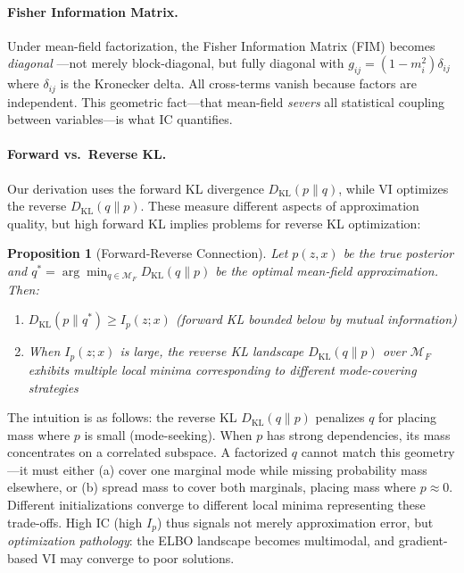 \documentclass[10pt]{article} %
\theoremstyle{plain}
\newtheorem{proposition}[theorem]{Proposition}
\theoremstyle{definition}
\newcommand{\MI}{I}
\newcommand{\KL}{D_{\mathrm{KL}}}
\begin{document}
\paragraph{Fisher Information Matrix.} Under mean-field factorization, the Fisher Information Matrix (FIM) becomes \emph{diagonal} \citep{amari2016information}---not merely block-diagonal, but fully diagonal with $g_{ij} = (1 - m_i^2)\delta_{ij}$ where $\delta_{ij}$ is the Kronecker delta. All cross-terms vanish because factors are independent. This geometric fact---that mean-field \emph{severs} all statistical coupling between variables---is what IC quantifies.

\paragraph{Forward vs.\ Reverse KL.} Our derivation uses the forward KL divergence $\KL(p \| q)$, while VI optimizes the reverse $\KL(q \| p)$. These measure different aspects of approximation quality, but high forward KL implies problems for reverse KL optimization:

\begin{proposition}[Forward-Reverse Connection]
\label{prop:forward-reverse}
Let $p(z,x)$ be the true posterior and $q^* = \arg\min_{q \in \mathcal{M}_F} \KL(q \| p)$ be the optimal mean-field approximation. Then:
\begin{enumerate}
    \item $\KL(p \| q^*) \geq \MI_p(z;x)$ (forward KL bounded below by mutual information)
    \item When $\MI_p(z;x)$ is large, the reverse KL landscape $\KL(q \| p)$ over $\mathcal{M}_F$ exhibits multiple local minima corresponding to different mode-covering strategies
\end{enumerate}
\end{proposition}

The intuition is as follows: the reverse KL $\KL(q\|p)$ penalizes $q$ for placing mass where $p$ is small (mode-seeking). When $p$ has strong dependencies, its mass concentrates on a correlated subspace. A factorized $q$ cannot match this geometry---it must either (a) cover one marginal mode while missing probability mass elsewhere, or (b) spread mass to cover both marginals, placing mass where $p \approx 0$. Different initializations converge to different local minima representing these trade-offs. High IC (high $\MI_p$) thus signals not merely approximation error, but \emph{optimization pathology}: the ELBO landscape becomes multimodal, and gradient-based VI may converge to poor solutions.
\end{document}

